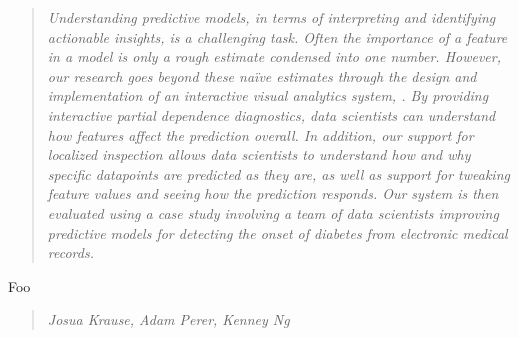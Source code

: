 \begin{quote}\textit{
Understanding predictive models, in terms of interpreting and identifying actionable
insights, is a challenging task.
Often the importance of a feature in a model is only a rough estimate
condensed into one number.  However, our research goes beyond these na\"ive estimates through the design and implementation of an interactive visual analytics system,
\prospector. By providing interactive partial dependence diagnostics, data scientists can understand how features affect the prediction overall.  In addition, our support for localized inspection allows data scientists to understand how and why specific datapoints are predicted as they are, as well as support for  tweaking feature values and seeing how the prediction responds.  Our system is then evaluated using a case study involving a team of data scientists improving predictive models for detecting the onset of diabetes from electronic medical records.
}\end{quote}

\begin{contributions}{Foo}
\item {}
\end{contributions}

\begin{quote}
\textit{Josua Krause, Adam Perer, Kenney Ng}
\end{quote}










% 
% 

% 

